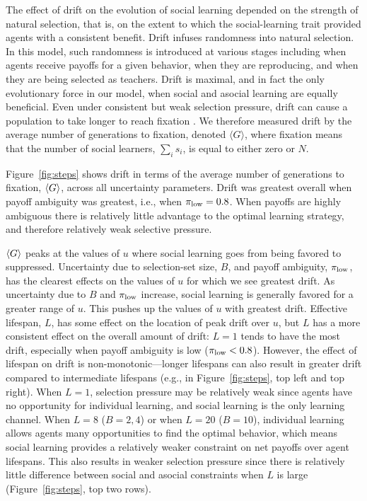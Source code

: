 \documentclass[letterpaper,11.5pt]{scrartcl}
\begin{document}
The effect of drift on the evolution of social learning %
depended on the strength of natural selection, that is, on the extent to which the
social-learning trait provided agents with a consistent benefit. Drift infuses
randomness into natural selection. In this model, such randomness is introduced at
various stages including when agents receive payoffs for a given behavior, when they
are reproducing, and when they are being selected as teachers. Drift is maximal, and
in fact the only evolutionary force in our model, when social and asocial learning
are equally beneficial. Even under consistent but weak selection pressure, drift can cause a population to take longer to reach fixation \citep{plutynski2007drift}. We therefore measured drift by the average number of generations to fixation, denoted $\langle G \rangle$, where fixation means that the number of social learners, $\sum_i s_i$, is equal to either zero or $N$. %

Figure~\ref{fig:steps} shows drift in terms of the average number of generations to fixation, $\langle G \rangle$, across all uncertainty parameters. Drift was greatest overall when payoff ambiguity was greatest, i.e., when $\pi_{\mathrm{low}} = 0.8$. When payoffs are highly ambiguous there is relatively little advantage to the optimal learning strategy, and therefore relatively weak selective pressure.

$\langle G \rangle$ peaks at the values of $u$ where social learning goes from being favored to suppressed. Uncertainty due to selection-set size, $B$, and payoff ambiguity, $\pi_{\mathrm{low}}$, has the clearest effects on the values of $u$ for which we see greatest drift. As uncertainty due to $B$ and $\pi_{\mathrm{low}}$ increase, social learning is generally favored for a greater range of $u$. This pushes up the values of $u$ with greatest drift. Effective lifespan, $L$, has some effect on the location of peak
drift over $u$, but $L$ has a more consistent effect on the overall amount of drift: $L=1$ tends to have the most drift, especially when payoff ambiguity is low ($\pi_{\mathrm{low}} < 0.8$). However, the effect of lifespan on drift is non-monotonic---longer lifespans can also result in greater drift compared to intermediate lifespans (e.g., in Figure~\ref{fig:steps}, top left and top right). When $L=1$, selection pressure may be relatively weak since agents have no opportunity for individual learning, and social learning is the only learning channel. When $L=8$ ($B=2,4$) or when $L=20$ ($B=10$), individual learning allows agents many opportunities to find the optimal behavior, which means social learning provides a relatively weaker constraint on net payoffs over agent lifespans. This also results in weaker selection pressure since there is relatively little difference between social and asocial constraints when $L$ is large
(Figure~\ref{fig:steps}, top two rows).
\end{document}
